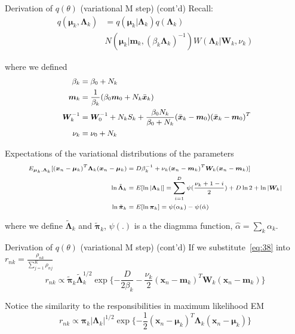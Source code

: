 \documentclass[10pt,mathserif]{beamer}
\begin{document}
\begin{frame}{Derivation of $q(\theta)$ (variational M step) (cont'd)}
Recall: 
\begin{equation}
    \begin{split}
        q(\bm{\mu}_k, \bm{\Lambda}_k) & = q (\bm{\mu}_k|\bm{\Lambda}_k)q (\bm{\Lambda}_k)\\
        & N (\bm{\mu}_k|\bm{m}_k, (\beta_k\bm{\Lambda}_k)^{-1}) W(\bm{\Lambda}_k|\bm{W}_k, \nu_k)
    \end{split}
\end{equation}

where we defined
\begin{equation}\small~\label{eq:37}
    \begin{split}
        \beta_k & = \beta_0+N_k\\
        \bm{m}_k & = \frac{1}{\beta_k} (\beta_0\bm{m}_0 +N_k \bar{\bm{x}}_k)\\
        \bm{W}_k^{-1} & = \bm{W}_0^{-1}+N_k S_k + \frac{\beta_0 N_k}{\beta_0 + N_k}(\bar{\bm{x}}_k - \bm{m}_0)(\bar{\bm{x}}_k - \bm{m}_0)^T\\
        \nu_k & = \nu_0+N_k
    \end{split}
\end{equation}

Expectations of the variational distributions of the parameters
\begin{equation}\label{eq:38}\scriptsize
    \begin{split}
        E_{\bm{\mu}_k,\bm{\Lambda}_k} [(\bm{x}_n - \bm{\mu}_k)^T\bm{\Lambda}_k(\bm{x}_n - \bm{\mu}_k) & =  D\beta_k^{-1} + \nu_k(\bm{x}_n - \bm{m}_k)^T \bm{W}_k(\bm{x}_n - \bm{m}_k)] \\
        \ln\tilde{\bm{\Lambda}}_k & = E[\ln |\bm{\Lambda}_k|] = \sum_{i=1}^D \psi (\frac{\nu_k + 1 -i}{2}) + D\ln2 + \ln|\bm{W}_k|\\
        \ln\tilde{\bm{\pi}}_k & = E[\ln\bm{\pi}_k] = \psi(\alpha_k) - \psi(\hat{\alpha})
    \end{split}
\end{equation}

where we define $\tilde{\bm{\Lambda}}_k$ and $\tilde{\bm{\pi}}_k$, $\psi(.)$ is a the diagmma function, $\hat{\alpha} = \sum_k\alpha_k$.
\end{frame}

\begin{frame}{Derivation of $q(\theta)$ (variational M step) (cont'd)}
If we substitute~\eqref{eq:38} into $r_{nk} = \frac{\rho_{nk}}{\sum_{j=1}^K \rho_{nj}}$
\begin{equation}
    r_{nk} \propto \tilde{\bm{\pi}}_k \tilde{\bm{\Lambda}}_k^{1/2}\exp\{-\frac{D}{2\beta_k}-\frac{\nu_k}{2}(\bm{x}_n - \bm{m}_k)^T \bm{W}_k (\bm{x}_n - \bm{m}_k) \}
\end{equation}

Notice the similarity to the responsibilities in maximum likelihood EM
\begin{equation}
    r_{nk} \propto \bm{\pi}_k |\bm{\Lambda}_k|^{1/2}\exp\{-\frac{1}{2}(\bm{x}_n - \bm{\mu}_k)^T \bm{\Lambda}_k (\bm{x}_n - \bm{\mu}_k) \}
\end{equation}
\end{frame}
\end{document}

